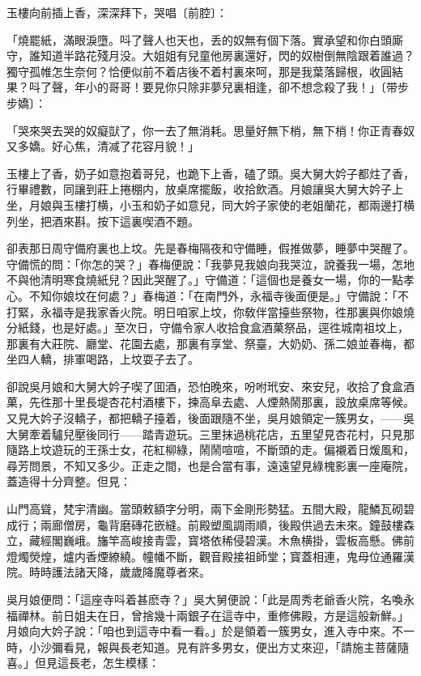 玉樓向前插上香，深深拜下，哭唱〔前腔〕：

\begin{myquote}
「燒罷紙，滿眼淚墮。呌了聲人也天也，丢的奴無有個下落。實承望和你白頭廝守，誰知道半路花殘月没。大姐姐有兒童他房裏還好，閃的奴樹倒無陰跟着誰過？獨守孤帷怎生奈何？恰便似前不着店後不着村裏來呵，那是我葉落歸根，收圓結果？呌了聲，年小的哥哥！要見你只除非夢兒裏相逢，卻不想念殺了我！」{\marktext\small〔带步步嬌〕}：

「哭來哭去哭的奴癡獃了，你一去了無消耗。思量好無下梢，無下梢！你正青春奴又多嬌。好心焦，清减了花容月貌！」
\end{myquote}

玉樓上了香，奶子如意抱着哥兒，也跪下上香，磕了頭。吳大舅大妗子都炷了香，行畢禮數，同讓到莊上捲棚内，放桌席擺飯，收拾飲酒。月娘讓吳大舅大妗子上坐，月娘與玉樓打横，小玉和奶子如意兒，同大妗子家使的老姐蘭花，都兩邊打横列坐，把酒來斟。按下這裏喫酒不題。

卻表那日周守備府裏也上坟。先是春梅隔夜和守備睡，假推做夢，睡夢中哭醒了。守備慌的問：「你怎的哭？」春梅便說：「我夢見我娘向我哭泣，說養我一場，怎地不與他清明寒食燒紙兒？因此哭醒了。」守備道：「這個也是養女一場，你的一點孝心。不知你娘坟在何處？」春梅道：「在南門外，永福寺後面便是。」守備說：「不打緊，永福寺是我家香火院。明日咱家上坟，你敎伴當擡些祭物，徃那裏與你娘燒分紙錢，也是好處。」至次日，守備令家人收拾食盒酒菓祭品，逕徃城南祖坟上，那裏有大莊院、廳堂、花園去處，那裏有享堂、祭臺，大奶奶、孫二娘並春梅，都坐四人轎，排軍喝路，上坟耍子去了。

卻說吳月娘和大舅大妗子喫了囬酒，恐怕晚來，吩咐玳安、來安兒，收拾了食盒酒菓，先徃那十里長堤杏花村酒樓下，揀高阜去處、人煙熱鬧那裏，設放桌席等候。又見大妗子沒轎子，都把轎子擡着，後面跟隨不坐，吳月娘領定一簇男女，——吳大舅牽着驢兒壓後同行——踏青遊玩。三里抹過桃花店，五里望見杏花村，只見那隨路上坟遊玩的王孫士女，花紅柳綠，鬧鬧喧喧，不斷頭的走。偏襯着日煖風和，尋芳問景，不知又多少。正走之間，也是合當有事，遠遠望見綠槐影裏一座庵院，蓋造得十分齊整。但見：

\begin{myquote}
山門高聳，梵宇清幽。當頭敕額字分明，兩下金剛形勢猛。五間大殿，龍鱗瓦砌碧成行；兩廊僧房，龜背磨磚花嵌縫。前殿塑風調雨順，後殿供過去未來。鐘鼓樓森立，藏經閣巍峨。旛竿高峻接青雲，寳塔依稀侵碧漢。木魚横掛，雲板高懸。佛前燈燭熒煌，爐内香煙繚繞。幢幡不斷，觀音殿接祖師堂；寳蓋相連，鬼母位通羅漢院。時時護法諸天降，歲歲降魔尊者來。
\end{myquote}

吳月娘便問：「這座寺呌着甚麽寺？」吳大舅便說：「此是周秀老爺香火院，名喚永福禪林。前日姐夫在日，曾捨幾十兩銀子在這寺中，重修佛殿，方是這般新鮮。」月娘向大妗子說：「咱也到這寺中看一看。」於是領着一簇男女，進入寺中來。不一時，小沙彌看見，報與長老知道。見有許多男女，便出方丈來迎，「請施主菩薩隨喜。」但見這長老，怎生模樣：

